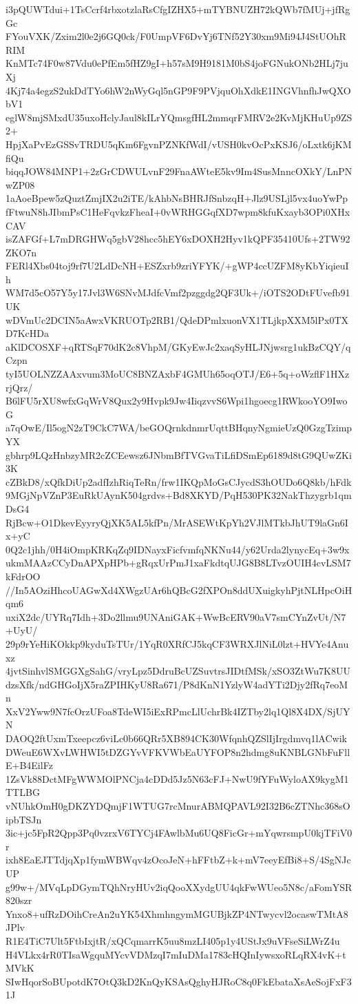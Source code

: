 i3pQUWTdui+1TsCcrf4rbxotzlaRsCfgIZHX5+mTYBNUZH72kQWb7fMUj+jfRgGc
FYouVXK/Zxim2l0e2j6GQ0ck/F0UmpVF6DvYj6TNf52Y30xm9Mi94J4StUOhRRIM
KnMTc74F0w87Vdu0ePfEm5fHZ9gI+h57sM9H9181M0bS4joFGNukONb2HLj7juXj
4Kj74a4egzS2ukDdTYo6hW2nWyGql5nGP9F9PVjquOhXdkE1INGVhnfhJwQXObV1
eglW8mjSMxdU35uxoHclyJaul8kILrYQmsgfHL2mmqrFMRV2e2KvMjKHuUp9ZS2+
HpjXaPvEzGSSvTRDU5qKm6FgvnPZNKfWdI/vUSH0kvOcPxKSJ6/oLxtk6jKMfiQu
biqqJOW84MNP1+2zGrCDWULvnF29FnaAWteE5kv9Im4SusMnncOXkY/LnPNwZP08
1aAoeBpew5zQuztZmjIX2u2iTE/kAhbNsBHRJfSnbzqH+Jlz9USLjl5vx4uoYwPp
fFtwuN8hJIbmPsC1HeFqvkzFheaI+0vWRHGGqfXD7wpm8kfuKxayb3OPi0XHxCAV
isZAFGf+L7mDRGHWq5gbV28hcc5hEY6xDOXH2Hyv1kQPF35410Ufs+2TW92ZKO7n
FERl4Xbs04toj9rf7U2LdDcNH+ESZxrb9zriYFYK/+gWP4ccUZFM8yKbYiqieuIh
WM7d5cO57Y5y17Jvl3W6SNvMJdfcVmf2pzggdg2QF3Uk+/iOTS2ODtFUvefb91UK
wDVmUc2DCIN5aAwxVKRUOTp2RB1/QdeDPmlxuonVX1TLjkpXXM5lPx0TXD7KcHDa
aKlDCOSXF+qRTSqF70dK2c8VhpM/GKyEwJc2xaqSyHLJNjwsrg1ukBzCQY/qCzpn
tyI5UOLNZZAAxvum3MoUC8BNZAxbF4GMUh65oqOTJ/E6+5q+oWzflF1HXzrjQrz/
B6lFU5rXU8wfxGqWrV8Qux2y9Hvpk9Jw4IiqzvvS6Wpi1hgoecg1RWkooYO9IwoG
a7qOwE/Il5ogN2zT9CkC7WA/beGOQrnkdnmrUqttBHqnyNgmieUzQ0GzgTzimpYX
gbhrp9LQzHnbzyMR2cZCEewsz6JNbmBfTVGvaTiLfiDSmEp6189d8tG9QUwZKi3K
cZBkD8/xQfkDiUp2adfIzhRiqTeRn/frw1IKQpMoGsCJycdS3hOUDo6Q8kb/hFdk
9MGjNpVZnP3EuRkUAynK504grdvs+Bd8XKYD/PqH530PK32NakThzygrb1qmDsG4
RjBcw+O1DkevEyyryQjXK5AL5kfPn/MrASEWtKpYh2VJlMTkbJhUT9laGn6Ix+yC
0Q2c1jhh/0H4iOmpKRKqZq9IDNayxFicfvmfqNKNu44/y62Urda2lynycEq+3w9x
ukmMAAzCCyDnAPXpHPb+gRqxUrPmJ1xaFkdtqUJG8B8LTvzOUIH4cvLSM7kFdrOO
//In5AOziHhcoUAGwXd4XWgzUAr6hQBcG2fXPOn8ddUXuigkyhPjtNLHpcOiHqm6
uxiX2dc/UYRq7Idh+3Do2llmu9UNAniGAK+WwBcERV90aV7smCYnZvUt/N7+UyU/
29p9rYeHiKOkkp9kyduTsTUr/1YqR0XRfCJ5kqCF3WRXJlNiL0lzt+HVYe4Anuxz
4jvtSinhvlSMGGXgSahG/vryLpz5DdruBcUZSuvtrsJIDtfMSk/xSO3ZtWu7K8UU
dzsXfk/ndGHGoIjX5raZPIHKyU8Ra671/P8dKnN1YzlyW4adYTi2Djy2fRq7eoMn
XxV2Yww9N7fcOrzUFoa8TdeWI5iExRPmcLlUchrBk4IZTby2lq1Ql8X4DX/SjUYN
DAOQ2ftUxmTxeepcz6viLc0b66QRr5XB894CK30WfqnhQZSlIjIrgdmvq1lACwik
DWeuE6WXvLWHWI5tDZGYvVFKVWbEaUYFOP8n2hdmg8uKNBLGNbFuFllE+B4EilFz
1ZsVk88DctMFgWWMOlPNCja4cDDd5Jz5N63cFJ+NwU9fYFuWyloAX9kygM1TTLBG
vNUhkOmH0gDKZYDQmjF1WTUG7rcMnurABMQPAVL92I32B6cZTNhc368sOipbTSJn
3ic+jc5FpR2Qpp3Pq0vzrxV6TYCj4FAwlbMu6UQ8FicGr+mYqwrsmpU0kjTFiV0r
ixh8EaEJTTdjqXp1fymWBWqv4zOcoJeN+hFFtbZ+k+mV7eeyEfBi8+S/4SgNJcUP
g99w+/MVqLpDGymTQhNryHUv2iqQooXXydgUU4qkFwWUeo5N8c/aFomYSR820szr
Ynxo8+ufRzDOihCreAn2uYK54XhmhngymMGUBjkZP4NTwycvl2ocaswTMtA8JPlv
R1E4TiC7Ult5FtbIxjtR/xQCqmarrK5uu8mzLI405p1y4UStJx9uVFseSiLWrZ4u
H4VLkx4rR0TIsaWgquMYcvVDMzqI7mIuDMa1783cHQInIywsxoRLqRX4vK+tMVkK
SIwHqorSoBUpotdK7OtQ3kD2KnQyKSAsQghyHJRoC8q0FkEbataXsAeSojFxF31J
